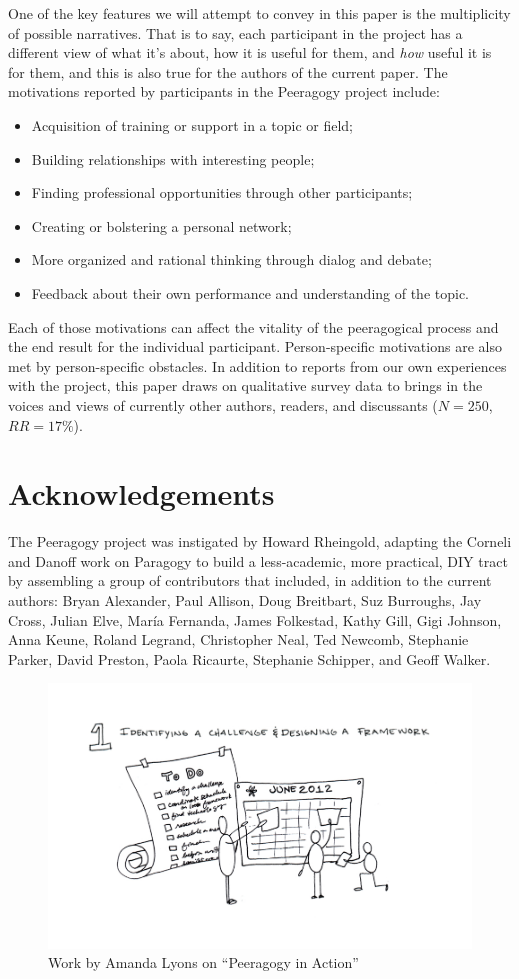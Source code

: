 \documentclass{acm_proc_article-sp}
\begin{document}
One of the key features we will attempt to convey in this paper is the multiplicity of possible narratives.  That is to say, each participant in the project has a different view of what it's about, how it is useful for them, and \emph{how} useful it is for them, and this is also true for the authors of the current paper.  The motivations reported by participants in the Peeragogy project include:
\begin{itemize}
\item Acquisition of training or support in a topic or field;
\item Building relationships with interesting people;
\item Finding professional opportunities through other participants;
\item Creating or bolstering a personal network;
\item More organized and rational thinking through dialog and debate;
\item Feedback about their own performance and understanding of the
  topic.
\end{itemize}

Each of those motivations can affect the vitality of the peeragogical process and the end result for the individual participant.  Person-specific motivations are also met by person-specific obstacles. In addition to reports from our own experiences with the project, this paper draws on qualitative survey data to brings in the voices and views of currently other authors, readers, and discussants ($N=250$, $RR=17\%$).

\section{Acknowledgements}

The Peeragogy project was instigated by Howard Rheingold, adapting the Corneli and Danoff \cite{paragogy} work on Paragogy to build a
less-academic, more practical, DIY tract by assembling a group of contributors that included, in addition to the current authors: Bryan Alexander, Paul Allison, Doug Breitbart, Suz Burroughs, Jay Cross, Julian Elve, Mar\'ia Fernanda, James Folkestad, Kathy Gill, Gigi Johnson, Anna Keune, Roland Legrand, Christopher Neal, Ted Newcomb, Stephanie Parker, David Preston, Paola Ricaurte, Stephanie Schipper, and Geoff Walker.

\begin{figure}
\begin{center}
\includegraphics[width=.5\textwidth]{OpenBook1.jpg}
\vspace{-.7in}
\end{center}
\caption{Work by Amanda Lyons on ``Peeragogy in Action''
  \cite{PeeragogyinAction} \label{amanda}}
\end{figure}
\end{document}
